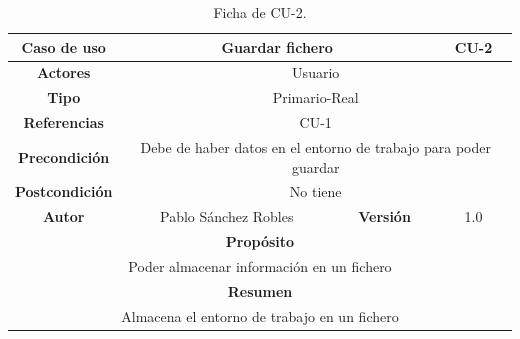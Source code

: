 \begin{table}[H]
\begin{center}
\resizebox{15cm}{!} {
\begin{tabular}{|c|c|c|c|}
\hline
\textbf{Caso de uso} &\multicolumn{2}{|c|}{Guardar fichero}  & CU-2	\\ \hline
\textbf{Actores} &\multicolumn{3}{|c|}{Usuario}	\\ \hline
\textbf{Tipo} & \multicolumn{3}{|c|}{Primario-Real}	\\ \hline
\textbf{Referencias} & \multicolumn{3}{|c|}{CU-1}	\\ \hline
\textbf{Precondición} &\multicolumn{3}{|c|}{Debe de haber datos en el entorno de trabajo para poder guardar}	\\ \hline
\textbf{Postcondición} &\multicolumn{3}{|c|}{No tiene	}	\\ \hline
\textbf{Autor} & Pablo Sánchez Robles & \textbf{Versión} & 1.0\\ \hline
\multicolumn{4}{|c|}{\textbf{Propósito}}	\\ \hline
\multicolumn{4}{|c|}{Poder almacenar información en un fichero}\\ \hline
\multicolumn{4}{|c|}{\textbf{Resumen}}\\ \hline
\multicolumn{4}{|c|}{
Almacena el entorno de trabajo en un fichero}\\ \hline
\end{tabular}
}
\caption{Ficha de CU-2.}
\end{center}
\end{table}

